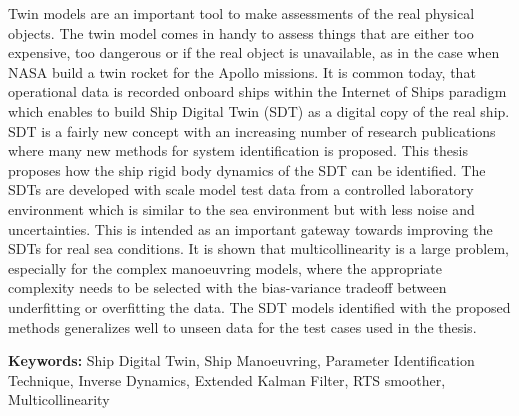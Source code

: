 
Twin models are an important tool to make assessments of the real physical objects. The twin model comes in handy to assess things that are either too expensive, too dangerous or if the real object is unavailable, as in the case when NASA build a twin rocket for the Apollo missions. 
It is common today, that operational data is recorded onboard ships within the Internet of Ships paradigm which enables to build Ship Digital Twin (SDT) as a digital copy of the real ship. SDT is a fairly new concept with an increasing number of research publications where many new methods for system identification is proposed.
\noindent This thesis proposes how the ship rigid body dynamics of the SDT can be identified. 
\noindent The SDTs are developed with scale model test data from a controlled laboratory environment which is similar to the sea environment but with less noise and uncertainties. This is intended as an important gateway towards improving the SDTs for real sea conditions. 
\noindent It is shown that multicollinearity is a large problem, especially for the complex manoeuvring models, where the appropriate complexity needs to be selected with the bias-variance tradeoff between underfitting or overfitting the data.
\noindent The SDT models identified with the proposed methods generalizes well to unseen data for the test cases used in the thesis.

\vspace{0.1cm}
\textbf{Keywords:} Ship Digital Twin, Ship Manoeuvring, Parameter Identification Technique, Inverse Dynamics, Extended Kalman Filter, RTS smoother, Multicollinearity

